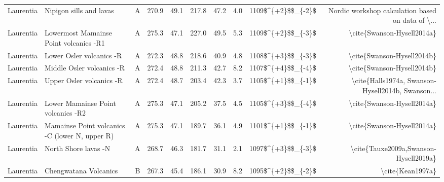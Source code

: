 \begin{longtable}{p{1 in}p{1 in}rrrrrrrr}
                     Laurentia &                            Nipigon sills and lavas &      A &     270.9 &      49.1 & 217.8 &  47.2 &       4.0 &     1109\$\textasciicircum \{+2\}\$\$\_\{-2\}\$ &  Nordic workshop calculation based on data of \textbackslash ... \\
                     Laurentia &             Lowermost Mamainse Point volcanics -R1 &      A &     275.3 &      47.1 & 227.0 &  49.5 &       5.3 &     1109\$\textasciicircum \{+2\}\$\$\_\{-3\}\$ &                         \textbackslash cite\{Swanson-Hysell2014a\} \\
                     Laurentia &                           Lower Osler volcanics -R &      A &     272.3 &      48.8 & 218.6 &  40.9 &       4.8 &     1108\$\textasciicircum \{+3\}\$\$\_\{-3\}\$ &                         \textbackslash cite\{Swanson-Hysell2014b\} \\
                     Laurentia &                          Middle Osler volcanics -R &      A &     272.4 &      48.8 & 211.3 &  42.7 &       8.2 &     1107\$\textasciicircum \{+4\}\$\$\_\{-4\}\$ &                         \textbackslash cite\{Swanson-Hysell2014b\} \\
                     Laurentia &                           Upper Osler volcanics -R &      A &     272.4 &      48.7 & 203.4 &  42.3 &       3.7 &     1105\$\textasciicircum \{+1\}\$\$\_\{-1\}\$ &  \textbackslash cite\{Halls1974a, Swanson-Hysell2014b, Swanson... \\
                     Laurentia &                 Lower Mamainse Point volcanics -R2 &      A &     275.3 &      47.1 & 205.2 &  37.5 &       4.5 &     1105\$\textasciicircum \{+3\}\$\$\_\{-4\}\$ &                         \textbackslash cite\{Swanson-Hysell2014a\} \\
                     Laurentia &     Mamainse Point volcanics -C (lower N, upper R) &      A &     275.3 &      47.1 & 189.7 &  36.1 &       4.9 &     1101\$\textasciicircum \{+1\}\$\$\_\{-1\}\$ &                         \textbackslash cite\{Swanson-Hysell2014a\} \\
                     Laurentia &                               North Shore lavas -N &      A &     268.7 &      46.3 & 181.7 &  31.1 &       2.1 &     1097\$\textasciicircum \{+3\}\$\$\_\{-3\}\$ &              \textbackslash cite\{Tauxe2009a,Swanson-Hysell2019a\} \\
                     Laurentia &                              Chengwatana Volcanics &      B &     267.3 &      45.4 & 186.1 &  30.9 &       8.2 &     1095\$\textasciicircum \{+2\}\$\$\_\{-2\}\$ &                                   \textbackslash cite\{Kean1997a\} \\

\end{longtable}
